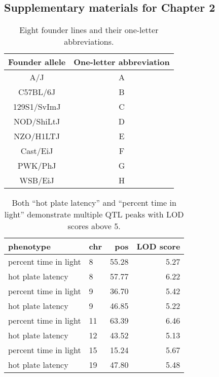\documentclass[oneside]{book}
\begin{document}
\newpage
\begin{appendices}
\appendixpage
\noappendicestocpagenum
\addappheadtotoc

\chapter{Supplementary materials for Chapter 2}

\renewcommand{\thetable}{\textbf{S\arabic{table}}}
\setcounter{table}{0}


\begin{table}
  \caption{Eight founder lines and their one-letter abbreviations.}
  \label{table-letters}
\begin{center}
\small
  \begin{tabular}{ c | c }
    \hline
    Founder allele & One-letter abbreviation \\ \hline
    A/J & A \\
    C57BL/6J & B \\
    129S1/SvImJ & C \\
    NOD/ShiLtJ & D\\
    NZO/H1LTJ & E\\
    Cast/EiJ & F\\
    PWK/PhJ & G\\
    WSB/EiJ & H\\
    \hline
  \end{tabular}

\end{center}
  \end{table}

\clearpage

\begin{table}
\caption{Both ``hot plate latency'' and ``percent time in light''
  demonstrate multiple QTL peaks with LOD scores above 5.}
  \label{table-peaks}
\begin{center}
\begin{tabular}{l|lrr}
  \hline
phenotype & chr & pos & LOD score \\
   \hline
percent time in light & 8 & 55.28 & 5.27 \\
 hot plate latency & 8 & 57.77 & 6.22 \\
 percent time in light & 9 & 36.70 & 5.42 \\
 hot plate latency & 9 & 46.85 & 5.22 \\
 percent time in light & 11 & 63.39 & 6.46 \\
 hot plate latency & 12 & 43.52 & 5.13 \\
 percent time in light & 15 & 15.24 & 5.67 \\
 hot plate latency & 19 & 47.80 & 5.48 \\
   \hline
\end{tabular}
\end{center}
\end{table}








\end{appendices}
\end{document}
